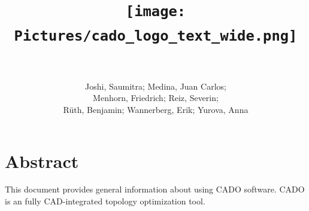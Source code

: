 \documentclass[
12pt, %
a4paper, %
oneside, %
headinclude,footinclude, %
BCOR5mm, %
]{scrartcl}
\title{\texttt{[image: Pictures/cado\_logo\_text\_wide.png]} \\ \normalfont\spacedallcaps{User Guide} \\
\vspace*{\fill}}%
\author{Joshi, Saumitra; Medina, Juan Carlos; \\ Menhorn, Friedrich; Reiz, Severin;\\ R{\"u}th, Benjamin;  Wannerberg, Erik; Yurova, Anna}%
\begin{document}
\newcommand{\titlebox}[2]{
\begin{tikzpicture}
\node[draw,thick,inner sep=6mm] (titlebox) {#2};
\node[fill=white] (Title) at (titlebox.north) {\bfseries \large #1};
\end{tikzpicture}
}
\renewcommand{\sectionmark}[1]{\markright{\spacedlowsmallcaps{#1}}} %

\newcommand{\titledframe}[2]{%
       \boxput*(0,1){\psframebox*{#1}}%
         {\psframebox[framesep=12pt]{#2}}}
         
\pagestyle{scrheadings} %



\maketitle %

\setcounter{tocdepth}{2} %
\newpage
\tableofcontents %




\section*{Abstract} %
This document provides general information about using CADO software. CADO is an fully CAD-integrated topology optimization tool.
\end{document}

